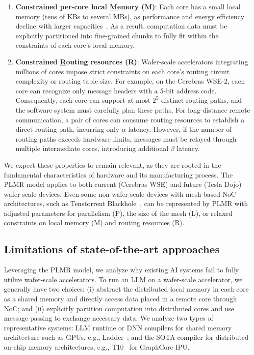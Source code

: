 \begin{enumerate}[label=(\arabic*), leftmargin=0.5cm, noitemsep,topsep=0pt]
\item \textbf{Constrained per-core local \underline{M}emory (M)}: Each core has a small local memory (tens of KBs to several MBs), as performance and energy efficiency decline with larger capacities~\cite{sram-wiki}. As a result, computation data must be explicitly partitioned into fine-grained chunks to fully fit within the constraints of each core's local memory.


\item \textbf{Constrained \underline{R}outing resources (R)}: Wafer-scale accelerators integrating millions of cores impose strict constraints on each core’s routing circuit complexity or routing table size. For example, on the Cerebras WSE-2, each core can recognize only message headers with a 5-bit address code. Consequently, each core can support at most $2^5$ distinct routing paths, and the software system must carefully plan these paths. For long-distance remote communication, a pair of cores can consume routing resources to establish a direct routing path, incurring only $\alpha$ latency. However, if the number of routing paths exceeds hardware limits, messages must be relayed through multiple intermediate cores, introducing additional $\beta$ latency.
\end{enumerate}

We expect these properties to remain relevant, as they are rooted in the fundamental characteristics of hardware and its manufacturing process. The PLMR model applies to both current (Cerebras WSE) and future (Tesla Dojo) wafer-scale devices. Even some non-wafer-scale devices with mesh-based NoC architectures, such as Tenstorrent Blackhole~\cite{tenstorrent}, can be represented by PLMR with adjusted parameters for parallelism (P), the size of the mesh (L), or relaxed constraints on local memory (M) and routing resources (R).


    \vspace{-3mm}
\subsection{Limitations of state-of-the-art approaches}
    \vspace{-1mm}
    
Leveraging the PLMR model, we analyze why existing AI systems fail to fully utilize wafer-scale accelerators.
To run an LLM on a wafer-scale accelerator, we generally have two choices: (i) abstract the distributed local memory in each core as a shared memory and directly access data placed in a remote core through NoC; and (ii) explicitly partition computation into distributed cores and use message passing to exchange necessary data. 
We analyze two types of representative systems: LLM runtime or DNN compilers for shared memory architecture such as GPUs, e.g., Ladder~\cite{ladder}; and the SOTA compiler for distributed on-chip memory architectures, e.g., T10~\cite{t10} for GraphCore IPU.

